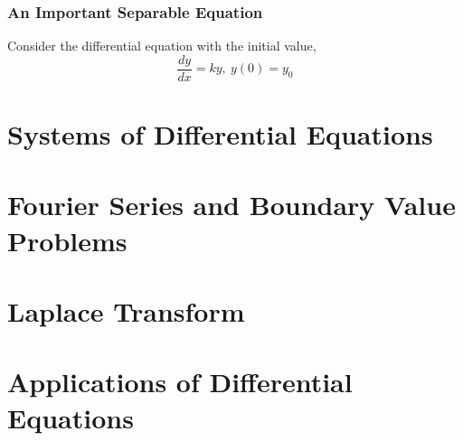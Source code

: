 \documentclass[14pt]{article}
\begin{document}
    \subsubsection{An Important Separable Equation}
    Consider the differential equation with the initial value,
    \begin{equation}\label{exponential_growth}
        \frac{dy}{dx}=ky,\ y(0)=y_0
    \end{equation}
    \section{Systems of Differential Equations}
    \section{Fourier Series and Boundary Value Problems}
    \section{Laplace Transform}
    \section{Applications of Differential Equations}
\end{document}
